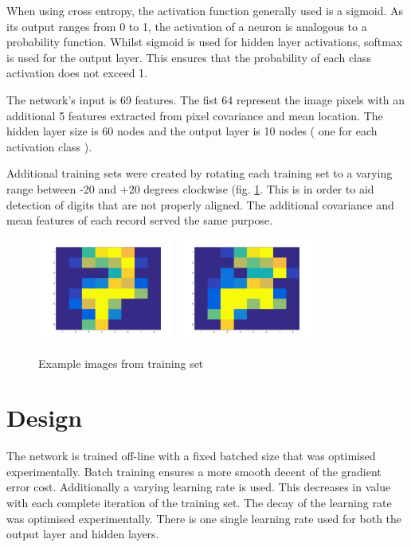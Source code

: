 \documentclass[11]{article}
\begin{document}
When using cross entropy, the activation function generally used is a sigmoid. As its output ranges from 0 to 1, the activation of a neuron is analogous to a probability function. Whilst sigmoid is used for hidden layer activations, softmax is used for the output layer. This ensures that the probability of each class activation does not exceed 1. 

The network's input is 69 features. The fist 64 represent the image pixels with an additional 5 features extracted from pixel covariance and mean location.  The hidden layer size is 60 nodes and the output layer is 10 nodes ( one for each activation class ). 

Additional training sets were created by rotating each training set to a varying range between -20 and +20 degrees clockwise (fig. \ref{fig:rotated}. This is in order to aid detection of digits that are not properly aligned. The additional covariance and mean features of each record served the same purpose. 
\begin{figure}[h]
\centering
\includegraphics[width=0.4\textwidth]{seven.png}
\includegraphics[width=0.4\textwidth]{seven_rotated.png}
\caption{Example images from training set}
\label{fig:rotated}
\end{figure}
\section{Design}

The network is trained off-line with a fixed batched size that was optimised experimentally. Batch training ensures a more smooth decent of the gradient error cost. Additionally a varying learning rate is used. This decreases in value with each complete iteration of the training set. The decay of the learning rate was optimised experimentally. There is one single learning rate used for both the output layer and hidden layers.
\end{document}
